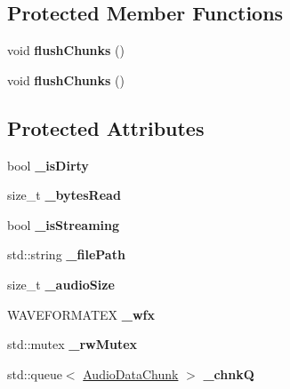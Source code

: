\subsection*{Protected Member Functions}
\begin{DoxyCompactItemize}
\item 
\mbox{\label{classexperimental_1_1AudioSourceReader_a643c2304ad7ac13ffc2e184e40ed616a}} 
void {\bfseries flush\+Chunks} ()
\item 
\mbox{\label{classexperimental_1_1AudioSourceReader_a9e26bc507bd811497daaf9823afec3cb}} 
void {\bfseries flush\+Chunks} ()
\end{DoxyCompactItemize}
\subsection*{Protected Attributes}
\begin{DoxyCompactItemize}
\item 
\mbox{\label{classexperimental_1_1AudioSourceReader_af79969ca6597cff092d9814bcb33252e}} 
bool {\bfseries \+\_\+is\+Dirty}
\item 
\mbox{\label{classexperimental_1_1AudioSourceReader_ac3c012c7df2c4589d4f7fbfb2a1b7454}} 
size\+\_\+t {\bfseries \+\_\+bytes\+Read}
\item 
\mbox{\label{classexperimental_1_1AudioSourceReader_a99c9cf3d62c481dd44fab0edcf3f3439}} 
bool {\bfseries \+\_\+is\+Streaming}
\item 
\mbox{\label{classexperimental_1_1AudioSourceReader_a621fcb55292d6750a423688b6266c9c1}} 
std\+::string {\bfseries \+\_\+file\+Path}
\item 
\mbox{\label{classexperimental_1_1AudioSourceReader_a847e418c8a72d65a08a09d9ccdb9bf54}} 
size\+\_\+t {\bfseries \+\_\+audio\+Size}
\item 
\mbox{\label{classexperimental_1_1AudioSourceReader_a69dacf45f7cb108d5f140f565f48d0ba}} 
W\+A\+V\+E\+F\+O\+R\+M\+A\+T\+EX {\bfseries \+\_\+wfx}
\item 
\mbox{\label{classexperimental_1_1AudioSourceReader_a9ff0d1f970db08082109c5d7f26d95b2}} 
std\+::mutex {\bfseries \+\_\+rw\+Mutex}
\item 
\mbox{\label{classexperimental_1_1AudioSourceReader_affc6b0d7de8ff3b49a9e3082684deadf}} 
std\+::queue$<$ \hyperlink{structexperimental_1_1AudioDataChunk}{Audio\+Data\+Chunk} $>$ {\bfseries \+\_\+chnkQ}
\end{DoxyCompactItemize}


